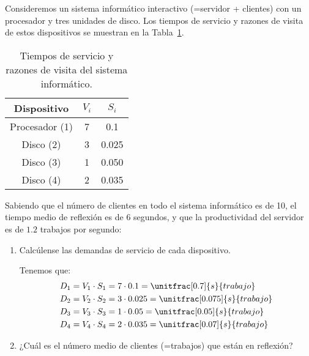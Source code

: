 \begin{comment}
\solucion
    \begin{enumerate}
        \item $X_0 = 100$ tr/s, $N_z = 2000$ tr.
        \item $R_0 = 4$ s.
        \item Tal y como está diseñado el servidor (con ese número de clientes y ese tiempo medio de reflexión), no se puede alcanzar una productividad media de 200 tr/s. En el caso límite de que $R_0 = 0$ s, $X_0$ sería 150 tr/s.
    \end{enumerate}
\end{comment}

\begin{ejercicio}\label{ej:5.11}
    Consideremos un sistema informático interactivo (=servidor + clientes) con un procesador y tres unidades de disco. Los tiempos de servicio y razones de visita de estos dispositivos se muestran en la Tabla~\ref{tab:5.11}.
    \begin{table}[h]
        \centering
        \begin{tabular}{|c|c|c|}
            \hline
            Dispositivo & $V_i$ & $S_i$ \\
            \hline
            Procesador (1) & 7 & 0.1 \\
            Disco (2) & 3 & 0.025 \\
            Disco (3) & 1 & 0.050 \\
            Disco (4) & 2 & 0.035 \\
            \hline
        \end{tabular}
        \caption{Tiempos de servicio y razones de visita del sistema informático.}
        \label{tab:5.11}
    \end{table}
    Sabiendo que el número de clientes en todo el sistema informático es de 10, el tiempo medio de reflexión es de 6 segundos, y que la productividad del servidor es de $1.2$ trabajos por segundo:
    \begin{enumerate}
        \item Calcúlense las demandas de servicio de cada dispositivo.
        
        Tenemos que:
        \begin{align*}
            D_1 &= V_1 \cdot S_1 = 7 \cdot 0.1 = \unitfrac[0.7]{s}{trabajo} \\
            D_2 &= V_2 \cdot S_2 = 3 \cdot 0.025 = \unitfrac[0.075]{s}{trabajo} \\
            D_3 &= V_3 \cdot S_3 = 1 \cdot 0.05 = \unitfrac[0.05]{s}{trabajo} \\
            D_4 &= V_4 \cdot S_4 = 2 \cdot 0.035 = \unitfrac[0.07]{s}{trabajo}
        \end{align*}
        \item ¿Cuál es el número medio de clientes (=trabajos) que están en reflexión?
        

\end{enumerate}
\end{ejercicio}
